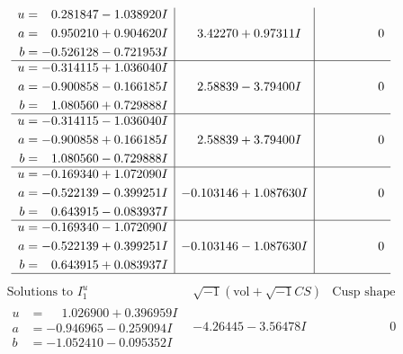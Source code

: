 \documentclass[1p]{elsarticle_modified}
\theoremstyle{definition}
\newcommand{\I}{\sqrt{-1}}
\begin{document}
$$\begin{array}{c|c|c}
\begin{aligned}
u &= \phantom{-}0.281847 - 1.038920 I \\
a &= \phantom{-}0.950210 + 0.904620 I \\
b &= -0.526128 - 0.721953 I\end{aligned}
 & \phantom{-}3.42270 + 0.97311 I & \phantom{-0.000000 } 0 \\ \hline\begin{aligned}
u &= -0.314115 + 1.036040 I \\
a &= -0.900858 - 0.166185 I \\
b &= \phantom{-}1.080560 + 0.729888 I\end{aligned}
 & \phantom{-}2.58839 - 3.79400 I & \phantom{-0.000000 } 0 \\ \hline\begin{aligned}
u &= -0.314115 - 1.036040 I \\
a &= -0.900858 + 0.166185 I \\
b &= \phantom{-}1.080560 - 0.729888 I\end{aligned}
 & \phantom{-}2.58839 + 3.79400 I & \phantom{-0.000000 } 0 \\ \hline\begin{aligned}
u &= -0.169340 + 1.072090 I \\
a &= -0.522139 - 0.399251 I \\
b &= \phantom{-}0.643915 - 0.083937 I\end{aligned}
 & -0.103146 + 1.087630 I & \phantom{-0.000000 } 0 \\ \hline\begin{aligned}
u &= -0.169340 - 1.072090 I \\
a &= -0.522139 + 0.399251 I \\
b &= \phantom{-}0.643915 + 0.083937 I\end{aligned}
 & -0.103146 - 1.087630 I & \phantom{-0.000000 } 0\\
 \hline 
 \end{array}$$\newpage$$\begin{array}{c|c|c}  
\text{Solutions to }I^u_{1}& \I (\text{vol} + \sqrt{-1}CS) & \text{Cusp shape}\\
 \hline 
\begin{aligned}
u &= \phantom{-}1.026900 + 0.396959 I \\
a &= -0.946965 - 0.259094 I \\
b &= -1.052410 - 0.095352 I\end{aligned}
 & -4.26445 - 3.56478 I & \phantom{-0.000000 } 0 \\ \hline\begin{aligned}

\end{aligned}
\end{array}$$
\end{document}
